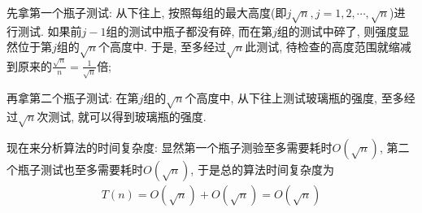 \documentclass{article}
\begin{document}
\begin{homeworkProblem}
	先拿第一个瓶子测试: 从下往上, 按照每组的最大高度(即$j\sqrt{n},j=1,2,\cdots,\sqrt{n}$)进行测试. 如果前$j-1$组的测试中瓶子都没有碎, 而在第$j$组的测试中碎了, 则强度显然位于第$j$组的$\sqrt{n}$个高度中. 于是, 至多经过$\sqrt{n}$此测试, 待检查的高度范围就缩减到原来的$\frac{\sqrt{n}}{n}=\frac{1}{\sqrt{n}}$倍;

	再拿第二个瓶子测试: 在第$j$组的$\sqrt{n}$个高度中, 从下往上测试玻璃瓶的强度, 至多经过$\sqrt{n}$次测试, 就可以得到玻璃瓶的强度.

	现在来分析算法的时间复杂度: 显然第一个瓶子测验至多需要耗时$O(\sqrt{n})$, 第二个瓶子测试也至多需要耗时$O(\sqrt{n})$, 于是总的算法时间复杂度为
	\begin{align}
		T(n)=O(\sqrt{n})+O(\sqrt{n})=O(\sqrt{n})
	\end{align}
	\newpage
\end{homeworkProblem}

\pagebreak
\end{document}
